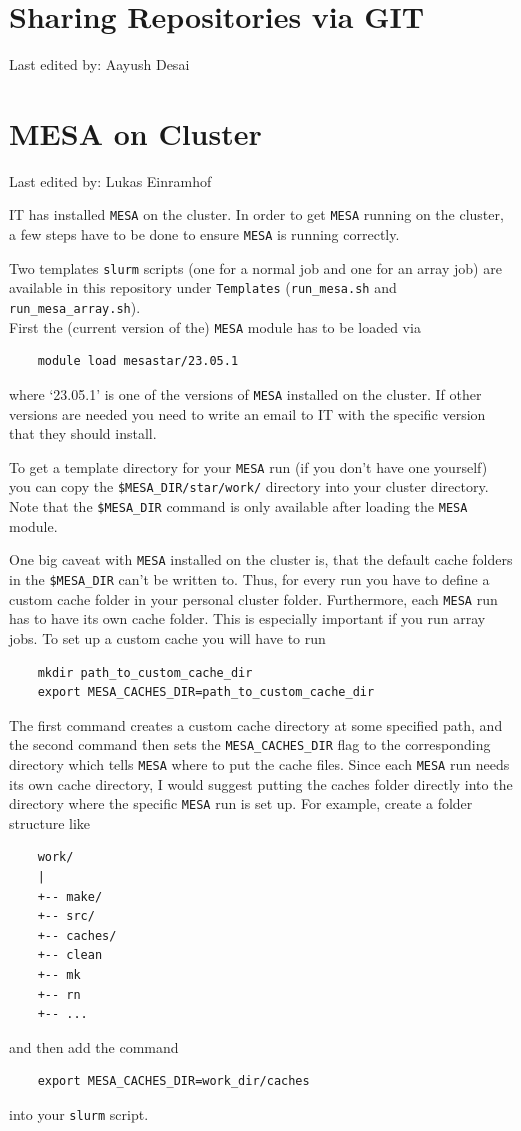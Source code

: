 \documentclass{article}
\newcommand{\setlasteditor}[1]{\gdef\lasteditor{#1}}
\newcommand{\lastedited}{%
    \vspace{1mm} {\footnotesize Last edited by: \lasteditor} \vspace{3mm}
    \newline

}
\begin{document}
\section{Sharing Repositories via GIT}
\setlasteditor{Aayush Desai}
\lastedited

\section{MESA on Cluster}
\setlasteditor{Lukas Einramhof}
\lastedited
IT has installed \texttt{MESA} on the cluster. In order to get \texttt{MESA} running on the cluster, a few steps have to be done to ensure \texttt{MESA} is running correctly.

Two templates \texttt{slurm} scripts (one for a normal job and one for an array job) are available in this repository under \texttt{Templates} (\texttt{run\_mesa.sh} and \texttt{run\_mesa\_array.sh}). \\

First the (current version of the) \texttt{MESA} module has to be loaded via
\begin{verbatim}
    module load mesastar/23.05.1
\end{verbatim}
where `23.05.1' is one of the versions of \texttt{MESA} installed on the cluster. 
If other versions are needed you need to write an email to IT with the specific version that they should install.

To get a template directory for your \texttt{MESA} run (if you don't have one yourself) you can copy the \texttt{\$MESA\_DIR/star/work/} directory into your cluster directory.
Note that the \texttt{\$MESA\_DIR} command is only available after loading the \texttt{MESA} module.

One big caveat with \texttt{MESA} installed on the cluster is, that the default cache folders in the \texttt{\$MESA\_DIR} can't be written to.
Thus, for every run you have to define a custom cache folder in your personal cluster folder. Furthermore, each \texttt{MESA} run has to have its own cache folder. This is especially important if you run array jobs.
To set up a custom cache you will have to run
\begin{verbatim}
    mkdir path_to_custom_cache_dir
    export MESA_CACHES_DIR=path_to_custom_cache_dir
\end{verbatim}
The first command creates a custom cache directory at some specified path, and the second command then sets the \texttt{MESA\_CACHES\_DIR} flag to the corresponding directory which tells \texttt{MESA} where to put the cache files.
Since each \texttt{MESA} run needs its own cache directory, I would suggest putting the caches folder directly into the directory where the specific \texttt{MESA} run is set up. For example, create a folder structure like
\begin{verbatim}
    work/
    |
    +-- make/
    +-- src/
    +-- caches/
    +-- clean
    +-- mk
    +-- rn
    +-- ...
\end{verbatim}
and then add the command
\begin{verbatim}
    export MESA_CACHES_DIR=work_dir/caches
\end{verbatim}
into your \texttt{slurm} script.
\end{document}
